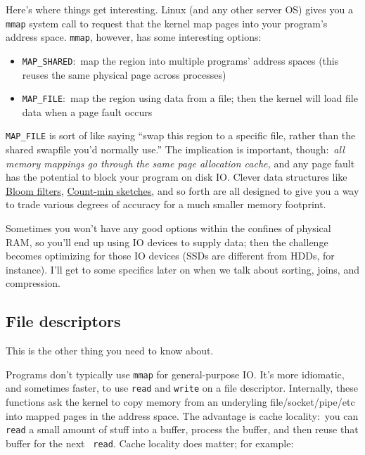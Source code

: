 \documentclass{article}
\newcommand{\lnk}[2]{\href{#1}{\textcolor[rgb]{1.0,0.0,0.0}{#2}}}
\begin{document}
  Here's where things get interesting. Linux (and any other server OS) gives you
  a {\tt mmap} system call to request that the kernel map pages into your
  program's address space. {\tt mmap}, however, has some interesting options:

  \begin{itemize}
    \item \verb|MAP_SHARED|:~map the region into multiple programs' address
          spaces (this reuses the same physical page across processes)
    \item \verb|MAP_FILE|:~map the region using data from a file; then the
          kernel will load file data when a page fault occurs
  \end{itemize}

  \verb|MAP_FILE| is sort of like saying ``swap this region to a specific file,
  rather than the shared swapfile you'd normally use.'' The implication is
  important, though:~{\it all memory mappings go through the same page
  allocation cache,} and any page fault has the potential to block your program
  on disk IO. Clever data structures like
  \lnk{https://en.wikipedia.org/wiki/Bloom_filter}{Bloom filters},
  \lnk{https://en.wikipedia.org/wiki/Count\%E2\%80\%93min_sketch}{Count-min
  sketches}, and so forth are all designed to give you a way to trade various
  degrees of accuracy for a much smaller memory footprint.

  Sometimes you won't have any good options within the confines of physical RAM,
  so you'll end up using IO devices to supply data; then the challenge becomes
  optimizing for those IO devices (SSDs are different from HDDs, for instance).
  I'll get to some specifics later on when we talk about sorting, joins, and
  compression.

  \subsection{File descriptors}
  This is the other thing you need to know about.

  Programs don't typically use {\tt mmap} for general-purpose IO. It's more
  idiomatic, and sometimes faster, to use {\tt read} and {\tt write} on a file
  descriptor. Internally, these functions ask the kernel to copy memory from an
  underyling file/socket/pipe/etc into mapped pages in the address space. The
  advantage is cache locality:~you can {\tt read} a small amount of stuff into a
  buffer, process the buffer, and then reuse that buffer for the next {\tt
  read}. Cache locality does matter; for example:
\end{document}
